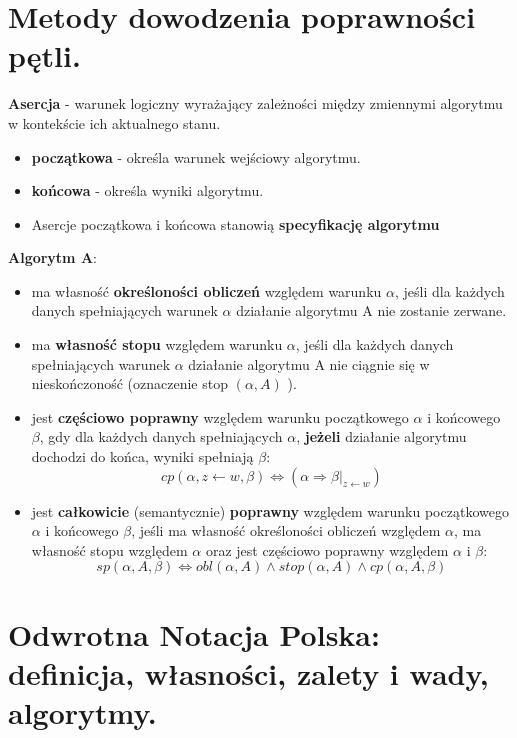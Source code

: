 \documentclass[main.tex]{subfiles}
\begin{document}
    \section{Metody dowodzenia poprawności pętli.}

    \textbf{Asercja} - warunek logiczny wyrażający zależności między zmiennymi
    algorytmu w kontekście ich aktualnego stanu.
    \begin{itemize}[noitemsep]
        \item \textbf{początkowa} - określa warunek wejściowy algorytmu.
        \item \textbf{końcowa} - określa wyniki algorytmu.
        \item Asercje początkowa i końcowa stanowią \textbf{specyfikację algorytmu}
    \end{itemize}

    \noindent \textbf{Algorytm A}:
    \begin{itemize}
        \item ma własność \textbf{określoności obliczeń} względem warunku $\alpha$, jeśli dla każdych danych
        spełniających warunek $\alpha$ działanie algorytmu A nie zostanie zerwane.

        \item ma \textbf{własność stopu} względem warunku $\alpha$, jeśli dla każdych danych spełniających warunek
        $\alpha$ działanie algorytmu A nie ciągnie się w nieskończoność (oznaczenie stop $( \alpha, A )$ ).

        \item jest \textbf{częściowo poprawny} względem warunku początkowego $\alpha$ i końcowego $\beta$,
        gdy dla każdych danych spełniających $\alpha$, \textbf{jeżeli} działanie algorytmu dochodzi do końca, wyniki
        spełniają $\beta$:
        \[cp ( \alpha, z \leftarrow w, \beta ) \iff ( \alpha \Rightarrow \beta|_{z \leftarrow w})\]

        \item jest \textbf{całkowicie} (semantycznie) \textbf{poprawny} względem warunku
        początkowego $\alpha$ i końcowego $\beta$, jeśli ma własność określoności obliczeń
        względem $\alpha$, ma własność stopu względem $\alpha$ oraz jest częściowo
        poprawny względem $\alpha$ i $\beta$:
        \[sp ( \alpha, A, \beta ) \iff obl ( \alpha, A ) \wedge stop ( \alpha, A ) \wedge cp ( \alpha, A, \beta )\]
    \end{itemize}


    \section{Odwrotna Notacja Polska: definicja, własności, zalety i wady, algorytmy.}
\end{document}
